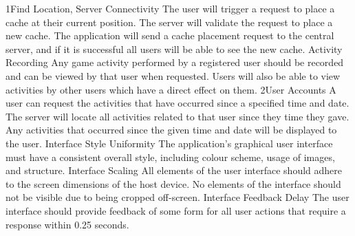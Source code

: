 			{1}{Find Location, Server Connectivity}
			{The user will trigger a request to place a cache at their current 
			position.}
			{The server will validate the request to place a new cache.}
			{The application will send a cache placement request to the 
			central server, and if it is successful all users will be able to 
			see the new cache.}
		\funcreq %
			{Activity Recording}
			{Any game activity performed by a registered user should be
			recorded and can be viewed by that user when requested. Users will
			also be able to view activities by other users which have a direct
			effect on them.}
			{2}{User Accounts}
			{A user can request the activities that have occurred since a
			specified time and date.}
			{The server will locate all activities related to that user since
			they time they gave.}
			{Any activities that occurred since the given time and date will
			be displayed to the user.}
		\nonfuncreq %
			{Interface Style Uniformity}
			{The application's graphical user interface must have a consistent
			overall style, including colour scheme, usage of images, and
			structure.}
		\nonfuncreq %
			{Interface Scaling}
			{All elements of the user interface should adhere to the screen
			dimensions of the host device. No elements of the interface should
			not be visible due to being cropped off-screen.}
		\nonfuncreq %
			{Interface Feedback Delay}
			{The user interface should provide feedback of some form for all
			user actions that require a response within 0.25 seconds.}
